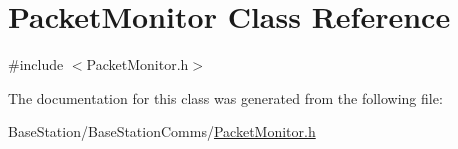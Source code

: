 \hypertarget{classPacketMonitor}{\section{Packet\-Monitor Class Reference}
\label{classPacketMonitor}
}


{\ttfamily \#include $<$Packet\-Monitor.\-h$>$}



The documentation for this class was generated from the following file\-:\begin{DoxyCompactItemize}
\item 
Base\-Station/\-Base\-Station\-Comms/\hyperlink{PacketMonitor_8h}{Packet\-Monitor.\-h}\end{DoxyCompactItemize}
